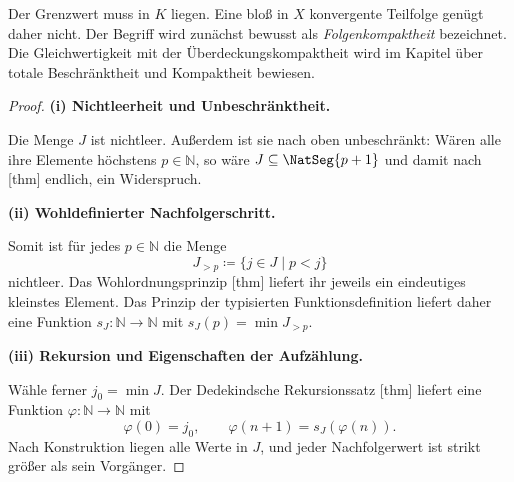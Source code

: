 \documentclass[main.tex]{subfiles}
\begin{document}
Der Grenzwert muss in \(K\) liegen. Eine bloß in \(X\) konvergente Teilfolge
genügt daher nicht. Der Begriff wird zunächst bewusst als
\emph{Folgenkompaktheit} bezeichnet. Die Gleichwertigkeit mit der
Überdeckungskompaktheit wird im Kapitel über totale Beschränktheit und
Kompaktheit bewiesen.

\begin{proof}
\par\medskip\noindent\textbf{(i) Nichtleerheit und Unbeschränktheit.}\par
Die Menge \(J\) ist nichtleer. Außerdem ist sie nach oben unbeschränkt:
Wären alle ihre Elemente höchstens \(p\in\mathbb N\), so wäre
\(J\subseteq\NatSeg{p+1}\) und damit nach
[thm] endlich, ein Widerspruch.

\par\medskip\noindent\textbf{(ii) Wohldefinierter Nachfolgerschritt.}\par
Somit ist für jedes \(p\in\mathbb N\) die Menge
\[
 J_{>p}\coloneqq\{j\in J\mid p<j\}
\]
nichtleer. Das Wohlordnungsprinzip
[thm] liefert ihr jeweils ein
eindeutiges kleinstes Element. Das Prinzip der typisierten
Funktionsdefinition liefert daher eine Funktion
\(s_J\colon\mathbb N\to\mathbb N\) mit
\(s_J(p)=\min J_{>p}\).

\par\medskip\noindent\textbf{(iii) Rekursion und Eigenschaften der Aufzählung.}\par
Wähle ferner \(j_0=\min J\). Der Dedekindsche Rekursionssatz
[thm] liefert eine Funktion
\(\varphi\colon\mathbb N\to\mathbb N\) mit
\[
 \varphi(0)=j_0,
 \qquad
 \varphi(n+1)=s_J(\varphi(n)).
\]
Nach Konstruktion liegen alle Werte in \(J\), und jeder Nachfolgerwert ist
strikt größer als sein Vorgänger.
\end{proof}
\end{document}

